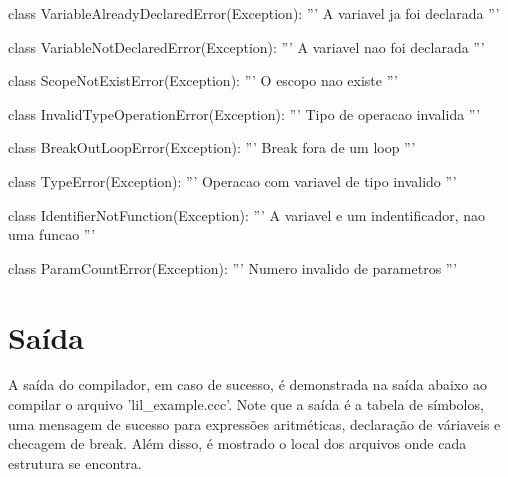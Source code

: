 \documentclass[
	12pt,				%
	openright,			%
	twoside,			%
	a4paper,			%
	english,			%
	french,				%
	spanish,			%
	brazil				%
	]{abntex2}
\begin{document}
\begin{python}
    class VariableAlreadyDeclaredError(Exception):
        ''' A variavel ja foi declarada '''

    class VariableNotDeclaredError(Exception):
        ''' A variavel nao foi declarada '''

    class ScopeNotExistError(Exception):
        ''' O escopo nao existe '''

    class InvalidTypeOperationError(Exception):
        ''' Tipo de operacao invalida '''

    class BreakOutLoopError(Exception):
        ''' Break fora de um loop '''

    class TypeError(Exception):
        ''' Operacao com variavel de tipo invalido '''

    class IdentifierNotFunction(Exception):
        ''' A variavel e um indentificador, nao uma funcao '''

    class ParamCountError(Exception):
        ''' Numero invalido de parametros '''
\end{python}

\section{Saída}

A saída do compilador, em caso de sucesso, é demonstrada na saída abaixo ao compilar o arquivo
'lil\_example.ccc'. Note que a saída é a tabela de símbolos, uma mensagem de sucesso para
expressões aritméticas, declaração de váriaveis e checagem de break. Além disso,
é mostrado o local dos arquivos onde cada estrutura se encontra.
\end{document}
